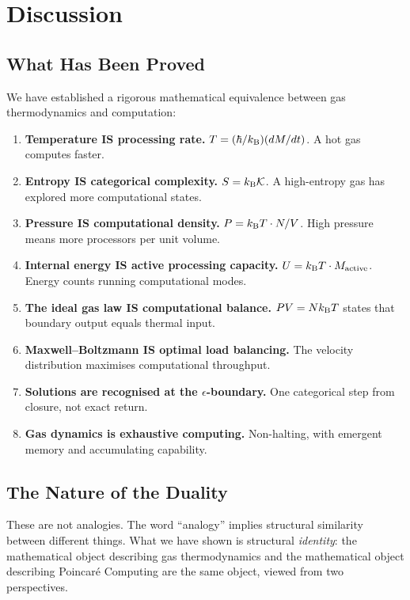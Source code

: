 \section{Discussion}
\label{sec:discussion}

\subsection{What Has Been Proved}

We have established a rigorous mathematical equivalence between gas thermodynamics and computation:

\begin{enumerate}
    \item \textbf{Temperature IS processing rate.} $T = (\hbar/k_{\mathrm{B}})(dM/dt)$. A hot gas computes faster.
    \item \textbf{Entropy IS categorical complexity.} $S = k_{\mathrm{B}} \mathcal{K}$. A high-entropy gas has explored more computational states.
    \item \textbf{Pressure IS computational density.} $P = k_{\mathrm{B}} T \cdot N/V$. High pressure means more processors per unit volume.
    \item \textbf{Internal energy IS active processing capacity.} $U = k_{\mathrm{B}} T \cdot M_{\mathrm{active}}$. Energy counts running computational modes.
    \item \textbf{The ideal gas law IS computational balance.} $PV = Nk_{\mathrm{B}} T$ states that boundary output equals thermal input.
    \item \textbf{Maxwell--Boltzmann IS optimal load balancing.} The velocity distribution maximises computational throughput.
    \item \textbf{Solutions are recognised at the $\epsilon$-boundary.} One categorical step from closure, not exact return.
    \item \textbf{Gas dynamics is exhaustive computing.} Non-halting, with emergent memory and accumulating capability.
\end{enumerate}

\subsection{The Nature of the Duality}

These are not analogies. The word ``analogy'' implies structural similarity between different things. What we have shown is structural \emph{identity}: the mathematical object describing gas thermodynamics and the mathematical object describing Poincar\'{e} Computing are the same object, viewed from two perspectives.

